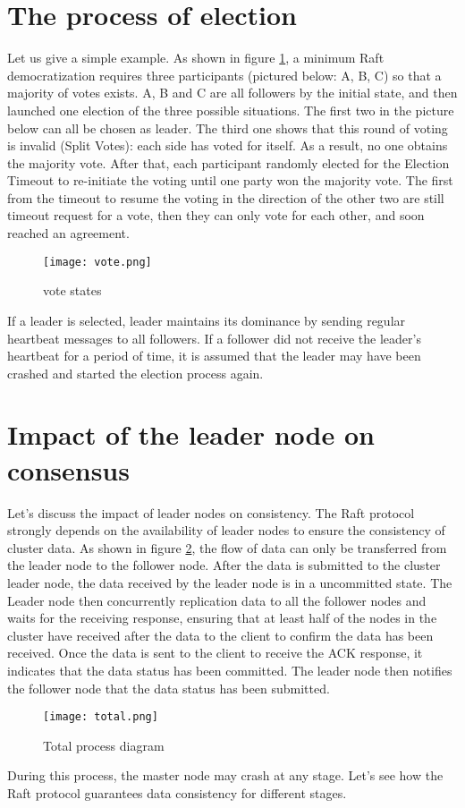 \documentclass{report}
\begin{document}
\section{The process of election}
Let us give a simple example. As shown in figure \ref{fig:vote}, a minimum Raft democratization requires three participants (pictured below: A, B, C) so that a majority of votes exists. A, B and C are all followers by the initial state, and then launched one election of the three possible situations. 
The first two in the picture below can all be chosen as leader. The third one shows that this round of voting is invalid (Split Votes): each side has voted for itself. As a result, no one obtains the majority vote. After that, each participant randomly elected for the Election Timeout to re-initiate the voting until one party won the majority vote. The first from the timeout to resume the voting in the direction of the other two are still timeout request for a vote, then they can only vote for each other, and soon reached an agreement.
\begin{figure}[H]
    \centering
    \texttt{[image: vote.png]}
    \caption{vote states}
    \label{fig:vote}
\end{figure}
If a leader is selected, leader maintains its dominance by sending regular heartbeat messages to all followers. If a follower did not receive the leader's heartbeat for a period of time, it is assumed that the leader may have been crashed and started the election process again.


\section{Impact of the leader node on consensus}
Let's discuss the impact of leader nodes on consistency. The Raft protocol strongly depends on the availability of leader nodes to ensure the consistency of cluster data. As shown in figure \ref{fig:total}, the flow of data can only be transferred from the leader node to the follower node. After the data is submitted to the cluster leader node, the data received by the leader node is in a uncommitted state. The Leader node then concurrently replication data to all the follower nodes and waits for the receiving response, ensuring that at least half of the nodes in the cluster have received after the data to the client to confirm the data has been received. Once the data is sent to the client to receive the ACK response, it indicates that the data status has been committed. The leader node then notifies the follower node that the data status has been submitted.
\begin{figure}[H]
    \centering
    \texttt{[image: total.png]}
    \caption{Total process diagram}
    \label{fig:total}
\end{figure}
During this process, the master node may crash at any stage. Let’s see how the Raft protocol guarantees data consistency for different stages.
\end{document}
